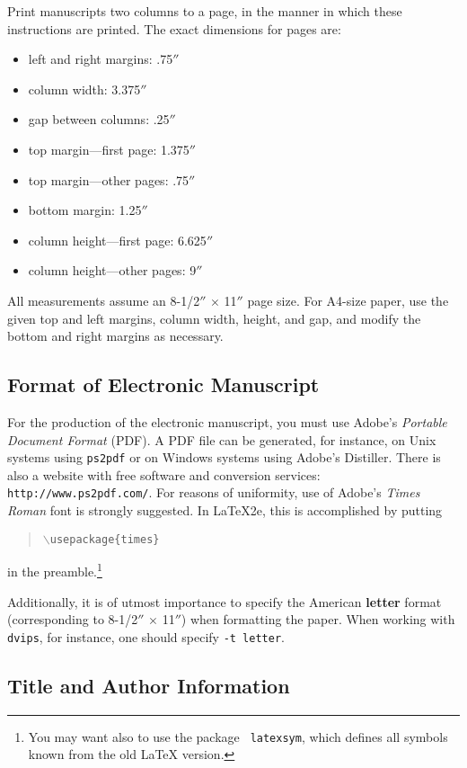 \documentclass{article}
\begin{document}
Print manuscripts two columns to a page, in the manner in which these
instructions are printed. The exact dimensions for pages are:
\begin{itemize}
\item left and right margins: .75$''$
\item column width: 3.375$''$
\item gap between columns: .25$''$
\item top margin---first page: 1.375$''$
\item top margin---other pages: .75$''$
\item bottom margin: 1.25$''$
\item column height---first page: 6.625$''$
\item column height---other pages: 9$''$
\end{itemize}

All measurements assume an 8-1/2$''$ $\times$ 11$''$ page size. For
A4-size paper, use the given top and left margins, column width,
height, and gap, and modify the bottom and right margins as necessary.

\subsection{Format of Electronic Manuscript}

For the production of the electronic manuscript, you must use Adobe's
{\em Portable Document Format} (PDF). A PDF file can be generated, for
instance, on Unix systems using {\tt ps2pdf} or on Windows systems
using Adobe's Distiller. There is also a website with free software
and conversion services: {\tt http://www.ps2pdf.com/}. For reasons of
uniformity, use of Adobe's {\em Times Roman} font is strongly suggested. In
\LaTeX2e{}, this is accomplished by putting
\begin{quote} 
\mbox{\tt $\backslash$usepackage\{times\}}
\end{quote}
in the preamble.\footnote{You may want also to use the package {\tt
latexsym}, which defines all symbols known from the old \LaTeX{}
version.}
  
Additionally, it is of utmost importance to specify the American {\bf
letter} format (corresponding to 8-1/2$''$ $\times$ 11$''$) when
formatting the paper. When working with {\tt dvips}, for instance, one
should specify {\tt -t letter}.

\subsection{Title and Author Information}
\end{document}
